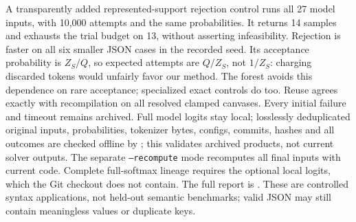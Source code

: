 A transparently added represented-support rejection control runs all 27 model
inputs, with 10,000 attempts and the same probabilities. It returns 14 samples
and exhausts the trial budget on 13, without asserting infeasibility. Rejection
is faster on all six smaller JSON cases in the recorded seed. Its acceptance
probability is $Z_S/Q$, so expected attempts are $Q/Z_S$, not $1/Z_S$:
charging discarded tokens would unfairly favor our method. The forest avoids
this dependence on rare acceptance; specialized exact controls do too.
Reuse agrees exactly with recompilation on all \MCfgReuseExact{} resolved
clamped canvases. Every initial failure and timeout remains archived.
Full model logits stay local; losslessly deduplicated original inputs,
probabilities, tokenizer bytes, configs, commits, hashes and all outcomes are
checked offline by ; this validates
archived products, not current solver outputs. The separate \texttt{--recompute}
mode recomputes all final inputs with current code. Complete full-softmax lineage
requires the optional local logits, which the Git checkout does not contain.
The full report is
.
These are controlled syntax applications, not held-out semantic benchmarks;
valid JSON may still contain meaningless values or duplicate keys.
